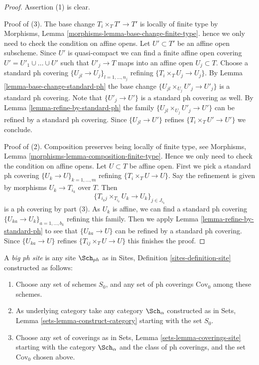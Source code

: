 \begin{proof}
Assertion (1) is clear.

\medskip\noindent
Proof of (3). The base change $T_i \times_T T' \to T'$ is
locally of finite type by
Morphisms, Lemma \ref{morphisms-lemma-base-change-finite-type}.
hence we only need to check the condition on affine opens.
Let $U' \subset T'$ be an affine open subscheme.
Since $U'$ is quasi-compact we can find a finite affine open
covering $U' = U'_1 \cup \ldots \cup U'$ such that
$U'_j \to T$ maps into an affine open $U_j \subset T$.
Choose a standard ph covering $\{U_{jl} \to U_j\}_{l = 1, \ldots, n_j}$
refining $\{T_i \times_T U_j \to U_j\}$.
By Lemma \ref{lemma-base-change-standard-ph}
the base change $\{U_{jl} \times_{U_j} U'_j \to U'_j\}$
is a standard ph covering. Note that $\{U'_j \to U'\}$
is a standard ph covering as well.
By Lemma \ref{lemma-refine-by-standard-ph} 
the family $\{U_{jl} \times_{U_j} U'_j \to U'\}$
can be refined by a standard ph covering. Since
$\{U_{jl} \to U'\}$ refines $\{T_i \times_T U' \to U'\}$
we conclude.

\medskip\noindent
Proof of (2). Composition preserves being locally of finite type,
see Morphisms, Lemma \ref{morphisms-lemma-composition-finite-type}.
Hence we only need to check the condition on affine opens.
Let $U \subset T$ be affine open. First we pick a standard ph covering
$\{U_k \to U\}_{k = 1, \ldots, m}$ refining
$\{T_i \times_T U \to U\}$.
Say the refinement is given by morphisms $U_k \to T_{i_k}$ over $T$.
Then
$$
\{T_{i_kj} \times_{T_{i_k}} U_k \to U_k\}_{j \in J_{i_k}}
$$
is a ph covering by part (3). As $U_k$ is affine,
we can find a standard ph covering
$\{U_{ka} \to U_k\}_{a = 1, \ldots, b_k}$ refining this family.
Then we apply Lemma \ref{lemma-refine-by-standard-ph}
to see that $\{U_{ka} \to U\}$ can be refined by a
standard ph covering. Since $\{U_{ka} \to U\}$
refines $\{T_{ij} \times_T U \to U\}$ this finishes the proof.
\end{proof}

\begin{definition}
\label{definition-big-ph-site}
A {\it big ph site} is any site $\Sch_{ph}$ as in
Sites, Definition \ref{sites-definition-site} constructed as follows:
\begin{enumerate}
\item Choose any set of schemes $S_0$, and any set of ph coverings
$\text{Cov}_0$ among these schemes.
\item As underlying category take any category $\Sch_\alpha$
constructed as in Sets, Lemma \ref{sets-lemma-construct-category}
starting with the set $S_0$.
\item Choose any set of coverings as in
Sets, Lemma \ref{sets-lemma-coverings-site} starting with the
category $\Sch_\alpha$ and the class of ph coverings,
and the set $\text{Cov}_0$ chosen above.
\end{enumerate}
\end{definition}

